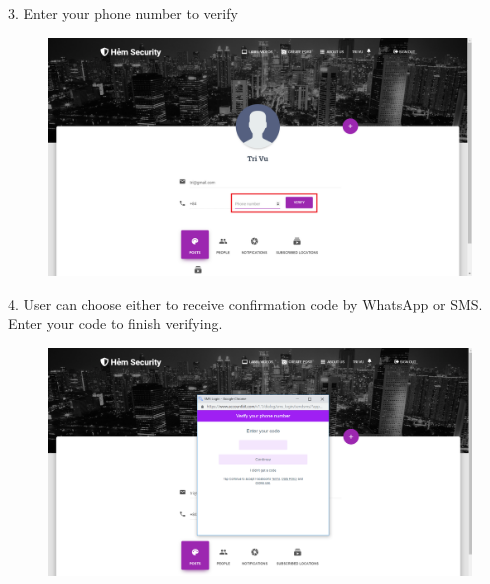 3. Enter your phone number to verify
\begin{center}
    \begin{figure}[H]
    \centering
    \includegraphics[width=1\columnwidth]{images/chap6/instruction3.png}
    \end{figure}
\end{center}
4. User can choose either to receive confirmation code by WhatsApp or SMS. Enter your code to finish verifying.
\begin{center}
    \begin{figure}[H]
    \centering
    \includegraphics[width=1\columnwidth]{images/chap6/instruction4.png}
    \end{figure}
\end{center}

